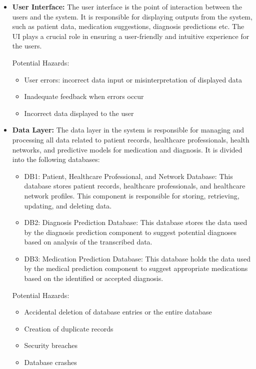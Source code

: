 \documentclass{article}
\begin{document}
\begin{itemize}
    \item \textbf{User Interface:}
    The user interface is the point of interaction between the users and the system. It is responsible for displaying outputs from the system, such as patient data, medication suggestions, diagnosis predictions etc. The UI plays a crucial role in ensuring a user-friendly and intuitive experience for the users.
    

    Potential Hazards:
    \begin{itemize}
        \item User errors: incorrect data input or misinterpretation of displayed data
        \item Inadequate feedback when errors occur
        \item Incorrect data displayed to the user
    \end{itemize}

    \item \textbf{Data Layer:}
    The data layer in the system is responsible for managing and processing all data related to patient records, healthcare professionals, health networks, and predictive models for medication and diagnosis. It is divided into the following databases:
    \begin{itemize}
        \item DB1: Patient, Healthcare Professional, and Network Database: This database stores patient records, healthcare professionals, and healthcare network profiles. This component is responsible for storing, retrieving, updating, and deleting data. 

        \item DB2: Diagnosis Prediction Database: This database stores the data used by the diagnosis prediction component to suggest potential diagnoses based on analysis of the transcribed data.

        \item DB3: Medication Prediction Database: This database holds the data used by the medical prediction component to suggest appropriate medications based on the identified or accepted diagnosis.
    \end{itemize}

    Potential Hazards:
    \begin{itemize}
        \item Accidental deletion of database entries or the entire database
        \item Creation of duplicate records
        \item Security breaches
        \item Database crashes   
    \end{itemize}


\end{itemize}
\end{document}
